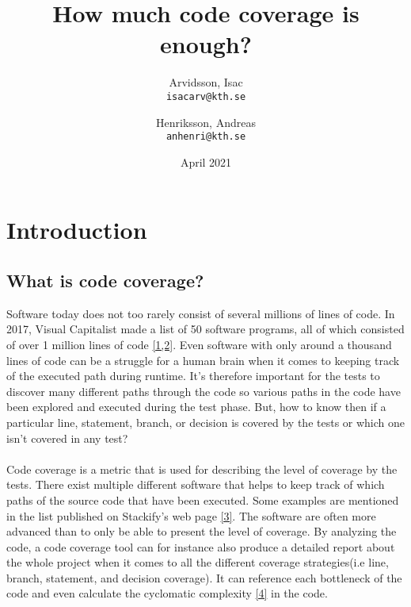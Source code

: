 \documentclass{article}
\title{How much code coverage is enough?}
\author{
  Arvidsson, Isac\\
  \texttt{isacarv@kth.se}
  \and
  Henriksson, Andreas\\
  \texttt{anhenri@kth.se}
}
\date{April 2021}
\begin{document}
\maketitle
\newpage
\section{Introduction}
\subsection{What is code coverage?}
Software today does not too rarely consist of several millions of lines of code. In 2017, Visual Capitalist made a list of 50 software programs, all of which consisted of over 1 million lines of code \hyperlink{1}{[1,2]}. Even software with only around a thousand lines of code can be a struggle for a human brain when it comes to keeping track of the executed path during runtime. It's therefore important for the tests to discover many different paths through the code so various paths in the code have been explored and executed during the test phase. But, how to know then if a particular line, statement, branch, or decision is covered by the tests or which one isn't covered in any test?
\\\\
Code coverage is a metric that is used for describing the level of coverage by the tests. There exist multiple different software that helps to keep track of which paths of the source code that have been executed. Some examples are mentioned in the list published on Stackify's web page \hyperlink{3}{[3]}. The software are often more advanced than to only be able to present the level of coverage. By analyzing the code, a code coverage tool can for instance also produce a detailed report about the whole project when it comes to all the different coverage strategies(i.e line, branch, statement, and decision coverage). It can reference each bottleneck of the code and even calculate the cyclomatic complexity \hyperlink{4}{[4]} in the code.
\end{document}
